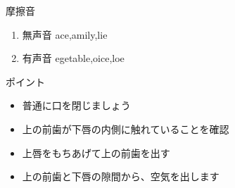 \documentclass[aspectratio=169,xcolor={dvipsnames,table}]{beamer}
\begin{document}
 \begin{frame}[plain]{摩擦音}

\large

\begin{enumerate}
 \item  無声音 \hspace{22pt}ace,\hspace{1\zw}amily,\hspace{1\zw}lie
 \item  有声音 \hspace{20pt}egetable,\hspace{1\zw}oice,\hspace{1\zw}loe
\end{enumerate}


\vspace*{20pt}

\normalsize
ポイント

\begin{itemize}
 \item 普通に口を閉じましょう
 \item 上の前歯が下唇の内側に触れていることを確認
 \item 上唇をもちあげて上の前歯を出す
 \item 上の前歯と下唇の隙間から、空気を出します
\end{itemize}

\hfill{}

\hypertarget{tips}{}
\hyperlink{ex}{}
\end{frame}
\end{document}
